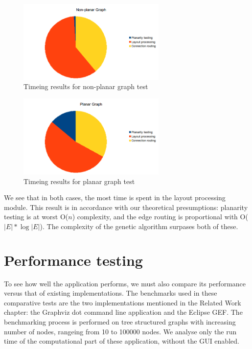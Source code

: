 \begin{figure}[ht] \centering
\includegraphics[width=0.65\textwidth]{img/results/nonplanartime.png}
\caption{Timeing results for non-planar graph test} \end{figure}


\begin{figure}[ht] \centering
\includegraphics[width=0.65\textwidth]{img/results/planartime.png}
\caption{Timeing results for planar graph test} \end{figure}

We see that in both cases, the most time is spent in the layout processing module. This result is in 
accordance with our theoretical presumptions: planarity testing is at worst O(${n}$) complexity, and the edge 
routing is proportional with O($|E| * \log |E|$). The complexity of the genetic algorithm surpases both of 
these.

\section{Performance testing}

To see how well the application performs, we must also compare its performance versus that of existing 
implementations. The benchmarks used in these comparative tests are the two implementations mentioned in the 
Related Work chapter: the Graphviz dot command line application and the Eclipse GEF. The benchmarking process 
is performed on tree structured graphs with increasing number of nodes, rangeing from 10 to 100000 nodes. We 
analyse only the run time of the computational part of these application, without the GUI enabled.

